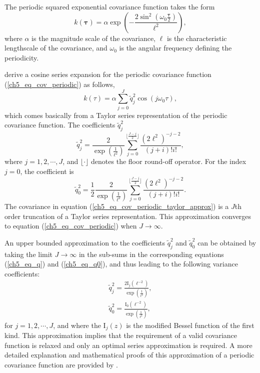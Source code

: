 \documentclass[onecolumn,a4paper,11pt]{article}
\begin{document}
The periodic squared exponential covariance function takes the form
%
\begin{equation} \label{ch5_eq_cov_periodic}
k(\bm{\tau})= \alpha \exp\left( -\frac{2\sin^{2}(\omega_0\frac{\bm{\tau}}{2})}{\ell^2}\right),
\end{equation}
where $\alpha$ is the magnitude scale of the covariance, $\ell$ is the characteristic lengthscale of the covariance, and $\omega_0$ is the angular frequency defining the periodicity. 

\citet{solin2014explicit} derive a cosine series expansion for the periodic covariance function (\ref{ch5_eq_cov_periodic}) as follows,
% 
\begin{equation} \label{ch5_eq_cov_periodic_taylor_approx}
k(\tau)= \alpha \sum_{j=0}^{J} \tilde{q}_j^2 \cos(j\omega_0 \tau),
\end{equation}
which comes basically from a Taylor series representation of the periodic covariance function. The coefficients $\tilde{q}_j^2$ 
%
\begin{equation} \label{ch5_eq_q}
\tilde{q}_j^2= \frac{2}{\exp(\frac{1}{\ell^2})} \sum_{j=0}^{\lfloor \frac{J-j}{2} \rfloor} \frac{(2\ell^2)^{-j-2}}{(j+i)!i!},
\end{equation}
where $j=1,2,\cdots,J$, and $\lfloor \cdot \rfloor$ denotes the floor round-off operator. For the index $j=0$, the coefficient is 
%
\begin{equation} \label{ch5_eq_q0}
\tilde{q}_0^2= \frac{1}{2} \frac{2}{\exp(\frac{1}{\ell^2})} \sum_{j=0}^{\lfloor \frac{J-j}{2} \rfloor} \frac{(2\ell^2)^{-j-2}}{(j+i)!i!}.
\end{equation}
The covariance in equation (\ref{ch5_eq_cov_periodic_taylor_approx}) is a $J$th order truncation of a Taylor series representation. This approximation converges to equation (\ref{ch5_eq_cov_periodic}) when $J \rightarrow \infty$.

An upper bounded approximation to the coefficients $\tilde{q}_j^2$ and $\tilde{q}_0^2$ can be obtained by taking the limit $J \rightarrow \infty$ in the sub-sums in the corresponding equations (\ref{ch5_eq_q}) and (\ref{ch5_eq_q0}), and thus leading to the following variance coefficients:
%
\begin{equation}\label{ch5_eq_q_2}
\begin{split}
\tilde{q}_j^2= \frac{2\mathrm{I}_j(\ell^{-2})}{\exp(\frac{1}{\ell^2})}, \\
\tilde{q}_0^2= \frac{\mathrm{I}_0(\ell^{-2})}{\exp(\frac{1}{\ell^2})},
\end{split}
\end{equation} 
for $j=1,2,\cdots,J$, and where the $\mathrm{I}_{j}(z)$ is the modified Bessel function \citep{handbook1970m} of the first kind. This approximation implies that the requirement of a valid covariance function is relaxed and only an optimal series approximation is required. A more detailed explanation and mathematical proofs of this approximation of a periodic covariance function are provided by \citet{solin2014explicit}. 
\end{document}
